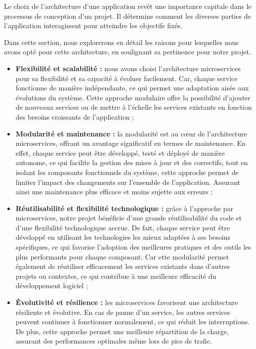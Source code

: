 \par Le choix de l'architecture d'une application revêt une importance capitale dans le processus de conception d'un projet. 
Il détermine comment les diverses parties de l'application interagissent pour atteindre les objectifs fixés.
\par Dans cette section, nous explorerons en détail les raisons pour lesquelles nous avons opté pour cette architecture, en soulignant sa pertinence pour notre projet.
\begin{itemize}
        \item \textbf{Flexibilité et scalabilité : } nous avons choisi l'architecture microservices pour sa flexibilité et sa capacité à évoluer facilement. 
        Car, chaque service fonctionne de manière indépendante, ce qui permet une adaptation aisée aux évolutions du système. Cette approche modulaire offre la possibilité 
        d'ajouter de nouveaux services ou de mettre à l'échelle les services existants en fonction des besoins croissants de l'application ; \\ 

        \item \textbf{Modularité et maintenance : } la modularité est au cœur de l'architecture microservices, offrant un avantage significatif en termes de maintenance.
        En effet, chaque service peut être développé, testé et déployé de manière autonome, ce qui facilite la gestion des mises à jour et des correctifs, tout en isolant 
        les composants fonctionnels du système, cette approche permet de limiter l'impact des changements sur l'ensemble de l'application.
         Assurant ainsi une maintenance plus efficace et moins sujette aux erreurs ;\\

        \item \textbf{Réutilisabilité et flexibilité technologique :} grâce à l'approche par microservices, notre projet bénéficie d'une grande réutilisabilité du code et
         d'une flexibilité technologique accrue. De fait, chaque service peut être développé en utilisant les technologies les mieux adaptées à ses besoins spécifiques, ce qui favorise 
         l'adoption des meilleures pratiques et des outils les plus performants pour chaque composant. Car ette modularité permet également de réutiliser efficacement les services
          existants dans d'autres projets ou contextes, ce qui contribue à une meilleure efficacité du développement logiciel ; \\


         \item \textbf{Évolutivité et résilience :} les microservices favorisent une architecture résiliente et évolutive. 
         En cas de panne d'un service, les autres services peuvent continuer à fonctionner normalement, ce qui réduit les interruptions.
         De plus, cette approche permet une meilleure répartition de la charge, assurant des performances optimales même lors de pics de trafic.
\end{itemize}
